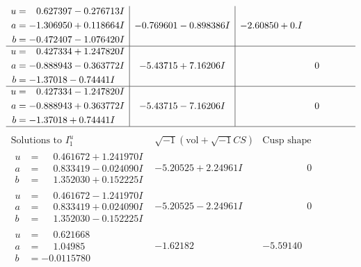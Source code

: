 \documentclass[1p]{elsarticle_modified}
\theoremstyle{definition}
\newcommand{\I}{\sqrt{-1}}
\begin{document}
$$\begin{array}{c|c|c}
\begin{aligned}
u &= \phantom{-}0.627397 - 0.276713 I \\
a &= -1.306950 + 0.118664 I \\
b &= -0.472407 - 1.076420 I\end{aligned}
 & -0.769601 - 0.898386 I & -2.60850 + 0. I\phantom{ +0.000000I} \\ \hline\begin{aligned}
u &= \phantom{-}0.427334 + 1.247820 I \\
a &= -0.888943 - 0.363772 I \\
b &= -1.37018 - 0.74441 I\end{aligned}
 & -5.43715 + 7.16206 I & \phantom{-0.000000 } 0 \\ \hline\begin{aligned}
u &= \phantom{-}0.427334 - 1.247820 I \\
a &= -0.888943 + 0.363772 I \\
b &= -1.37018 + 0.74441 I\end{aligned}
 & -5.43715 - 7.16206 I & \phantom{-0.000000 } 0\\
 \hline 
 \end{array}$$\newpage$$\begin{array}{c|c|c}  
\text{Solutions to }I^u_{1}& \I (\text{vol} + \sqrt{-1}CS) & \text{Cusp shape}\\
 \hline 
\begin{aligned}
u &= \phantom{-}0.461672 + 1.241970 I \\
a &= \phantom{-}0.833419 - 0.024090 I \\
b &= \phantom{-}1.352030 + 0.152225 I\end{aligned}
 & -5.20525 + 2.24961 I & \phantom{-0.000000 } 0 \\ \hline\begin{aligned}
u &= \phantom{-}0.461672 - 1.241970 I \\
a &= \phantom{-}0.833419 + 0.024090 I \\
b &= \phantom{-}1.352030 - 0.152225 I\end{aligned}
 & -5.20525 - 2.24961 I & \phantom{-0.000000 } 0 \\ \hline\begin{aligned}
u &= \phantom{-}0.621668\phantom{ +0.000000I} \\
a &= \phantom{-}1.04985\phantom{ +0.000000I} \\
b &= -0.0115780\phantom{ +0.000000I}\end{aligned}
 & -1.62182\phantom{ +0.000000I} & -5.59140\phantom{ +0.000000I} \\ \hline\begin{aligned}

\end{aligned}
\end{array}$$
\end{document}
